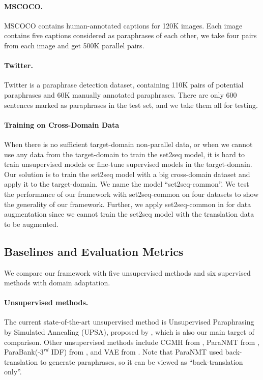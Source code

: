 \paragraph{MSCOCO. } MSCOCO \citep{lin2014microsoft} contains human-annotated captions for 120K images. Each image contains five captions considered as paraphrases of each other, we take four pairs from each image and get 500K parallel pairs.

\paragraph{Twitter. } Twitter \citep{lan2017continuously} is a paraphrase detection dataset, containing 110K pairs of potential paraphrases and 60K manually annotated paraphrases. There are only 600 sentences marked as paraphrases in the test set, and we take them all for testing.

\paragraph{Training on Cross-Domain Data} \label{sec:indomain}
When there is no sufficient target-domain non-parallel data, or when we cannot use any data from the target-domain to train the set2seq model, it is hard to train unsupervised models or fine-tune supervised models in the target-domain. Our solution is to train the set2seq model with a big cross-domain dataset and apply it to the target-domain. We name the model ``set2seq-common''. We test the performance of our framework with set2seq-common on four datasets to show the generality of our framework. Further, we apply set2seq-common in  for data augmentation since we cannot train the set2seq model with the translation data to be augmented.

\subsection{Baselines and Evaluation Metrics}
We compare our framework with five unsupervised methods and six supervised methods with domain adaptation.

\paragraph{Unsupervised methods. } The current state-of-the-art unsupervised method is Unsupervised Paraphrasing by Simulated Annealing (UPSA), proposed by \citet{liu2019unsupervised}, which is also our main target of comparison. Other unsupervised methods include CGMH from \citet{miao2019cgmh}, ParaNMT from \citet{wieting2017paranmt}, ParaBank(-$3^{rd}$ IDF) from \citet{hu2019parabank}, and VAE from \citet{kingma2013auto}. Note that ParaNMT used back-translation to generate paraphrases, so it can be viewed as ``back-translation only''.

